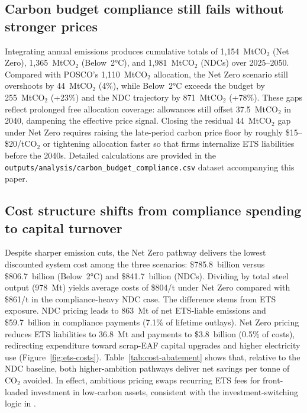 \documentclass[preprint,1p,authoryear]{elsarticle}
\begin{document}
\subsection{Carbon budget compliance still fails without stronger prices}

Integrating annual emissions produces cumulative totals of 1{,}154~MtCO$_2$ (Net Zero), 1{,}365~MtCO$_2$ (Below~2°C), and 1{,}981~MtCO$_2$ (NDCs) over 2025--2050. Compared with POSCO's 1{,}110~MtCO$_2$ allocation, the Net Zero scenario still overshoots by 44~MtCO$_2$ (4\%), while Below~2°C exceeds the budget by 255~MtCO$_2$ (+23\%) and the NDC trajectory by 871~MtCO$_2$ (+78\%). These gaps reflect prolonged free allocation coverage: allowances still offset 37.5~MtCO$_2$ in 2040, dampening the effective price signal. Closing the residual 44~MtCO$_2$ gap under Net Zero requires raising the late-period carbon price floor by roughly \$15--\$20/tCO$_2$ or tightening allocation faster so that firms internalize ETS liabilities before the 2040s. Detailed calculations are provided in the \texttt{outputs/analysis/carbon\_budget\_compliance.csv} dataset accompanying this paper.

\subsection{Cost structure shifts from compliance spending to capital turnover}

Despite sharper emission cuts, the Net Zero pathway delivers the lowest discounted system cost among the three scenarios: \$785.8~billion versus \$806.7~billion (Below~2°C) and \$841.7~billion (NDCs). Dividing by total steel output (978~Mt) yields average costs of \$804/t under Net Zero compared with \$861/t in the compliance-heavy NDC case. The difference stems from ETS exposure. NDC pricing leads to 863~Mt of net ETS-liable emissions and \$59.7~billion in compliance payments (7.1\% of lifetime outlays). Net Zero pricing reduces ETS liabilities to 36.8~Mt and payments to \$3.8~billion (0.5\% of costs), redirecting expenditure toward scrap-EAF capital upgrades and higher electricity use (Figure~\ref{fig:ets-costs}). Table~\ref{tab:cost-abatement} shows that, relative to the NDC baseline, both higher-ambition pathways deliver net savings per tonne of CO$_2$ avoided. In effect, ambitious pricing swaps recurring ETS fees for front-loaded investment in low-carbon assets, consistent with the investment-switching logic in \citet{fowlie2016carbon}.
\end{document}

